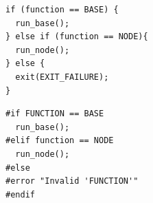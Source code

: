 
\begin{minipage}[b]{0.5\linewidth}
  \vspace{+10pt}
  \begin{center}
    \begin{lstlisting}
if (function == BASE) {
  run_base();
} else if (function == NODE){
  run_node();
} else {
  exit(EXIT_FAILURE);
}
    \end{lstlisting}
  \end{center}
\end{minipage}
\hspace{0.1cm}
\begin{minipage}[b]{0.5\linewidth}
  \vspace{+10pt}
  \begin{center}
    \begin{lstlisting}
#if FUNCTION == BASE
  run_base();
#elif function == NODE
  run_node();
#else
#error "Invalid 'FUNCTION'"
#endif
    \end{lstlisting}
  \end{center}
\end{minipage}

